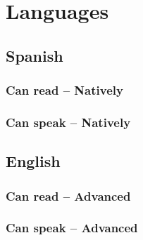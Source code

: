 \documentclass{article}
\begin{document}
\section{Languages}
\subsection{Spanish}
\subsubsection{Can read – Natively}
\subsubsection{Can speak – Natively}
\subsection{English}
\subsubsection{Can read – Advanced}
\subsubsection{Can speak – Advanced}
\end{document}
